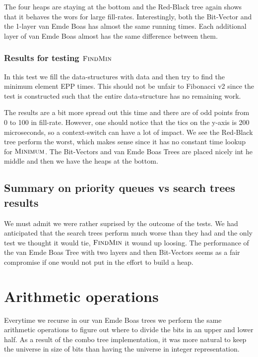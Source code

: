 \documentclass[oneside,11pt,openright]{report}
\newcommand{\FindMin}{\textsc{FindMin}}
\newcommand{\Minimum}{\textsc{Minimum}}
\begin{document}


The four heaps are staying at the bottom and the Red-Black tree again shows that it behaves the wors for large fill-rates. Interestingly, both the Bit-Vector and the 1-layer van Emde Boas has almost the same running times. Each additional layer of van Emde Boas almost has the same difference between them.

\subsection{Results for testing $\FindMin$}

In this test we fill the data-structures with data and then try to find the minimum element EPP times. This should not be unfair to Fibonacci v2 since the test is constructed such that the entire data-structure has no remaining work.



The results are a bit more spread out this time and there are of odd points from 0 to 100 in fill-rate. However, one should notice that the tics on the y-axis is 200 microseconds, so a context-switch can have a lot of impact. We see the Red-Black tree perform the worst, which makes sense since it has no constant time lookup for $\Minimum$. The Bit-Vectors and van Emde Boas Trees are placed nicely int he middle and then we have the heaps at the bottom.

\section{Summary on priority queues vs search trees results}

We must admit we were rather suprised by the outcome of the tests. We had anticipated that the search trees perform much worse than they had and the only test we thought it would tie, $\FindMin$ it wound up loosing. The performance of the van Emde Boas Tree with two layers and then Bit-Vectors seems as a fair compromise if one would not put in the effort to build a heap.


\chapter{Arithmetic operations}

Everytime we recurse in our van Emde Boas trees we perform the same arithmetic operations to figure out where to divide the bits in an upper and lower half. As a result of the combo tree implementation, it was more natural to keep the universe in size of bits than having the universe in integer representation. 
\end{document}
